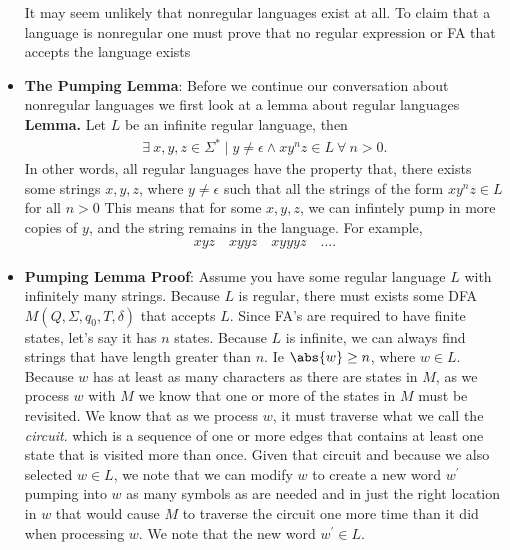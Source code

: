 \documentclass{report}
\begin{document}
\begin{itemize}
        \bigbreak \noindent 
        It may seem unlikely that nonregular languages exist at all. To claim that a language is nonregular one must prove that no regular expression or FA that accepts the language exists
        \bigbreak \noindent 
        \begin{figure}[ht]
            \centering
            \label{fig:p2}
        \end{figure}
        \pagebreak 
    \item \textbf{The Pumping Lemma}: Before we continue our conversation about nonregular languages we first look at a lemma about regular languages
        \bigbreak \noindent 
        \textbf{Lemma.} Let $L$ be an infinite regular language, then
        \begin{align*}
            \exists\ x,y,z \in \Sigma^{*} \mid y\ne \epsilon \land xy^{n}z \in L\ \forall\ n> 0
        .\end{align*}
        In other words, all regular languages have the property that, there exists some strings $x,y,z$, where $y\ne \epsilon$ such that all the strings of the form $xy^{n}z \in L$ for all $n>0 $
        \bigbreak \noindent 
        This means that for some $x,y,z$, we can infintely pump in more copies of $y$, and the string remains in the language. For example,
        \begin{align*}
            xyz \quad xyyz \quad xyyyz \quad ...
        .\end{align*}
    \item \textbf{Pumping Lemma Proof}: Assume you have some regular language $L$ with infinitely many strings. Because $L$ is regular, there must exists some DFA $M(Q, \Sigma, q_{0}, T, \delta) $ that accepts $L$. Since FA's are required to have finite states, let's say it has $n$ states.
        \bigbreak \noindent 
        Because $L$ is infinite, we can always find strings that have length greater than $n$. Ie $\abs{w} \ge n$, where $w\in L$. Because $w$ has at least as many characters as there are states in $M$, as we process $w$ with $M$ we know that one or more of the states in $M$ must be revisited. We know that as we process $w$, it must traverse what we call the \textit{circuit}. which is a sequence of one or more edges that contains at least one state that is visited more than once.
        \bigbreak \noindent 
        Given that circuit and because we also selected $w \in L$, we note that we can modify $w$ to create a new word $w^{\prime}$ pumping into $w$ as many symbols as are needed and in just the right location in $w$ that would cause $M $ to traverse the circuit one more time than it did when processing $w$. We note that the new word $w^{\prime} \in L$.

\end{itemize}
\end{document}
